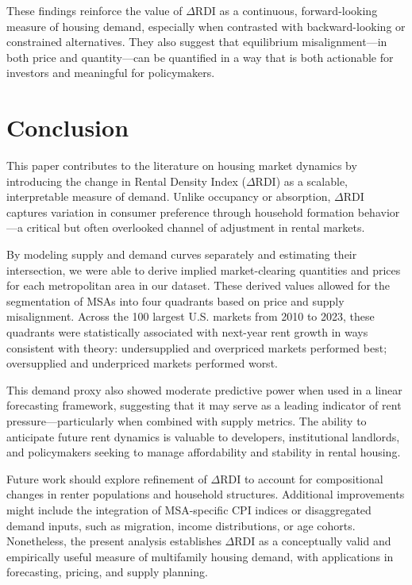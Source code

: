 \documentclass[sn-mathphys-num]{sn-jnl}%
\theoremstyle{thmstyleone}%
\theoremstyle{thmstyletwo}%
\theoremstyle{thmstylethree}%
\begin{document}
These findings reinforce the value of \(\Delta\text{RDI}\) as a continuous, forward-looking measure of housing demand, especially when contrasted with backward-looking or constrained alternatives. They also suggest that equilibrium misalignment---in both price and quantity---can be quantified in a way that is both actionable for investors and meaningful for policymakers.

\section{Conclusion}

This paper contributes to the literature on housing market dynamics by introducing the change in Rental Density Index (\(\Delta\text{RDI}\)) as a scalable, interpretable measure of demand. Unlike occupancy or absorption, \(\Delta\text{RDI}\) captures variation in consumer preference through household formation behavior---a critical but often overlooked channel of adjustment in rental markets.

By modeling supply and demand curves separately and estimating their intersection, we were able to derive implied market-clearing quantities and prices for each metropolitan area in our dataset. These derived values allowed for the segmentation of MSAs into four quadrants based on price and supply misalignment. Across the 100 largest U.S. markets from 2010 to 2023, these quadrants were statistically associated with next-year rent growth in ways consistent with theory: undersupplied and overpriced markets performed best; oversupplied and underpriced markets performed worst.

This demand proxy also showed moderate predictive power when used in a linear forecasting framework, suggesting that it may serve as a leading indicator of rent pressure---particularly when combined with supply metrics. The ability to anticipate future rent dynamics is valuable to developers, institutional landlords, and policymakers seeking to manage affordability and stability in rental housing.

Future work should explore refinement of \(\Delta\text{RDI}\) to account for compositional changes in renter populations and household structures. Additional improvements might include the integration of MSA-specific CPI indices or disaggregated demand inputs, such as migration, income distributions, or age cohorts. Nonetheless, the present analysis establishes \(\Delta\text{RDI}\) as a conceptually valid and empirically useful measure of multifamily housing demand, with applications in forecasting, pricing, and supply planning.
\end{document}

